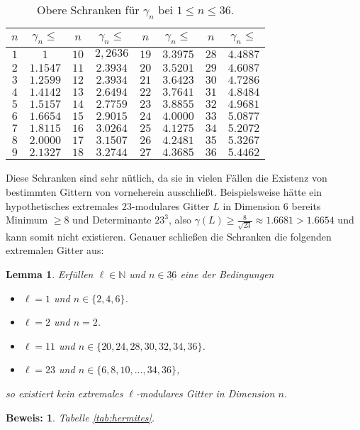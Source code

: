 \documentclass[12pt,a4paper,halfparskip,headsepline,bibtotocnumbered]{scrreprt}
\theoremstyle{nummermitklammern}
\newtheorem{lemma}[defsatzusw]{Lemma}
\theoremstyle{nonumberbreak}
\newtheorem{beweis}{Beweis:}
\newcommand{\N}{\mathbb{N}}
\begin{document}
\begin{table}\label{tab:hermites}
\centering
	\begin{tabular}{|c|c||c|c||c|c||c|c|}
		\hline
		$n$		&$\gamma_n\leq$		&$n$	&$\gamma_n\leq$		&$n$	&$\gamma_n\leq$		&$n$	&$\gamma_n\leq$ \\ \hline
		$1$		&$1$				&$10$	&$2,2636$			&$19$	&$3.3975$			&$28$	&$4.4887$ \\ \hline
		$2$		&$1.1547$			&$11$	&$2.3934$			&$20$	&$3.5201$			&$29$	&$4.6087$ \\ \hline
		$3$		&$1.2599$			&$12$	&$2.3934$			&$21$	&$3.6423$			&$30$	&$4.7286$ \\ \hline
		$4$		&$1.4142$			&$13$	&$2.6494$			&$22$	&$3.7641$			&$31$	&$4.8484$ \\ \hline
		$5$		&$1.5157$			&$14$	&$2.7759$			&$23$	&$3.8855$			&$32$	&$4.9681$ \\ \hline
		$6$		&$1.6654$			&$15$	&$2.9015$			&$24$	&$4.0000$			&$33$	&$5.0877$ \\ \hline
		$7$		&$1.8115$			&$16$	&$3.0264$			&$25$	&$4.1275$			&$34$	&$5.2072$ \\ \hline
		$8$		&$2.0000$			&$17$	&$3.1507$			&$26$	&$4.2481$			&$35$	&$5.3267$ \\ \hline
		$9$		&$2.1327$			&$18$	&$3.2744$			&$27$	&$4.3685$			&$36$	&$5.4462$ \\
		\hline
	\end{tabular}
	\caption{Obere Schranken für $\gamma_n$ bei $1 \leq n \leq 36$.}
\end{table}

Diese Schranken sind sehr nütlich, da sie in vielen Fällen die Existenz von bestimmten Gittern von vorneherein ausschließt. Beispielsweise hätte ein hypothetisches extremales $23$-modulares Gitter $L$ in Dimension $6$ bereits Minimum $\geq 8$ und Determinante $23^3$, also $\gamma(L) \geq \frac{8}{\sqrt{23}} \approx 1.6681 > 1.6654$ und kann somit nicht existieren. Genauer schließen die Schranken die folgenden extremalen Gitter aus:

\begin{framed}
	\begin{lemma}
		Erfüllen $\ell \in \N$ und $n \in \underline{36}$ eine der Bedingungen
		\begin{itemize}
			\item $\ell = 1$ und $n \in \lbrace 2,4,6 \rbrace$.
			\item $\ell = 2$ und $n = 2$.
			\item $\ell = 11$ und $n \in \lbrace 20, 24, 28, 30, 32, 34, 36 \rbrace$.
			\item $\ell = 23$ und $n \in \lbrace 6, 8, 10, \dots, 34, 36 \rbrace$,
		\end{itemize}
		so existiert kein extremales $\ell$-modulares Gitter in Dimension $n$.
	\end{lemma}
\end{framed}
\begin{beweis}
	Tabelle \eqref{tab:hermites}.
\end{beweis}
\end{document}
